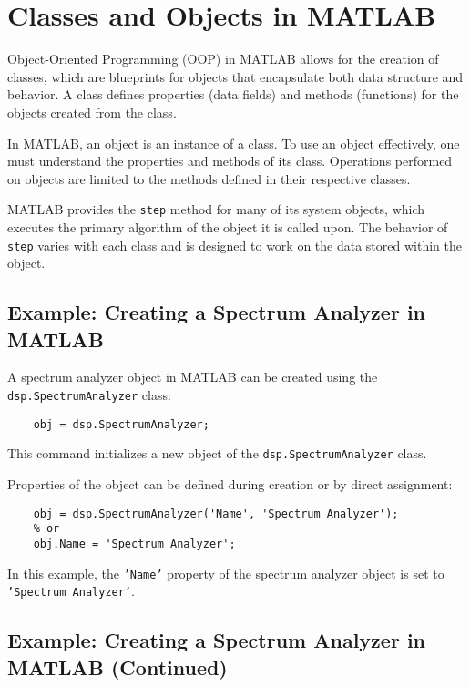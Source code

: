 \section*{Classes and Objects in MATLAB}

Object-Oriented Programming (OOP) in MATLAB allows for the creation of classes, which are blueprints for objects that encapsulate both data structure and behavior. A class defines properties (data fields) and methods (functions) for the objects created from the class.

In MATLAB, an object is an instance of a class. To use an object effectively, one must understand the properties and methods of its class. Operations performed on objects are limited to the methods defined in their respective classes.

MATLAB provides the \texttt{step} method for many of its system objects, which executes the primary algorithm of the object it is called upon. The behavior of \texttt{step} varies with each class and is designed to work on the data stored within the object.

\subsection*{Example: Creating a Spectrum Analyzer in MATLAB}

A spectrum analyzer object in MATLAB can be created using the \texttt{dsp.SpectrumAnalyzer} class:
\begin{verbatim}
    obj = dsp.SpectrumAnalyzer;
\end{verbatim}
This command initializes a new object of the \texttt{dsp.SpectrumAnalyzer} class.

Properties of the object can be defined during creation or by direct assignment:
\begin{verbatim}
    obj = dsp.SpectrumAnalyzer('Name', 'Spectrum Analyzer');
    % or
    obj.Name = 'Spectrum Analyzer';
\end{verbatim}
In this example, the \texttt{'Name'} property of the spectrum analyzer object is set to \texttt{'Spectrum Analyzer'}.


\subsection*{Example: Creating a Spectrum Analyzer in MATLAB (Continued)}

